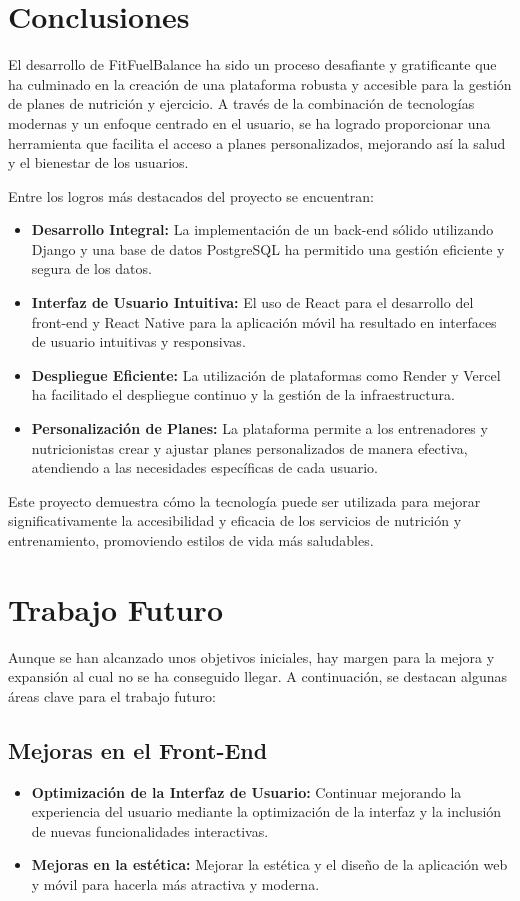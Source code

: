 \label{sec:conclusiones}

\section{Conclusiones}
El desarrollo de FitFuelBalance ha sido un proceso desafiante y gratificante que ha culminado en la creación de una plataforma robusta y accesible para la gestión de planes de nutrición y ejercicio. A través de la combinación de tecnologías modernas y un enfoque centrado en el usuario, se ha logrado proporcionar una herramienta que facilita el acceso a planes personalizados, mejorando así la salud y el bienestar de los usuarios.

Entre los logros más destacados del proyecto se encuentran:
\begin{itemize}
    \item \textbf{Desarrollo Integral:} La implementación de un back-end sólido utilizando Django y una base de datos PostgreSQL ha permitido una gestión eficiente y segura de los datos.
    \item \textbf{Interfaz de Usuario Intuitiva:} El uso de React para el desarrollo del front-end y React Native para la aplicación móvil ha resultado en interfaces de usuario intuitivas y responsivas.
    \item \textbf{Despliegue Eficiente:} La utilización de plataformas como Render y Vercel ha facilitado el despliegue continuo y la gestión de la infraestructura.
    \item \textbf{Personalización de Planes:} La plataforma permite a los entrenadores y nutricionistas crear y ajustar planes personalizados de manera efectiva, atendiendo a las necesidades específicas de cada usuario.
\end{itemize}

Este proyecto demuestra cómo la tecnología puede ser utilizada para mejorar significativamente la accesibilidad y eficacia de los servicios de nutrición y entrenamiento, promoviendo estilos de vida más saludables.

\section{Trabajo Futuro}
Aunque se han alcanzado unos objetivos iniciales, hay margen para la mejora y expansión al cual no se ha conseguido llegar. A continuación, se destacan algunas áreas clave para el trabajo futuro:

\subsection{Mejoras en el Front-End}
\begin{itemize}
    \item \textbf{Optimización de la Interfaz de Usuario:} Continuar mejorando la experiencia del usuario mediante la optimización de la interfaz y la inclusión de nuevas funcionalidades interactivas.
    \item \textbf{Mejoras en la estética:} Mejorar la estética y el diseño de la aplicación web y móvil para hacerla más atractiva y moderna.
\end{itemize}

